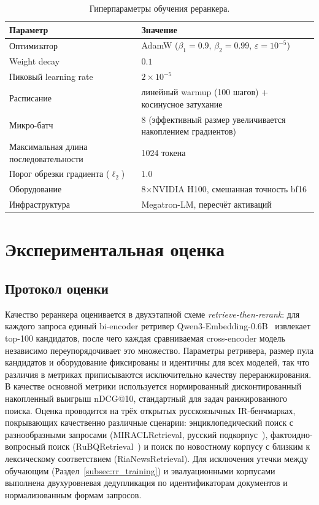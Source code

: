 \begin{table}[H]
    \centering
    \caption{Гиперпараметры обучения реранкера.}
    \label{tab:rr_hyperparams}
    \begin{tabular}{p{}p{}}
        \toprule
        Параметр & Значение \\
        \midrule
        Оптимизатор & AdamW ($\beta_1 = 0.9$, $\beta_2 = 0.99$, $\varepsilon = 10^{-5}$) \\
        Weight decay & $0.1$ \\
        Пиковый learning rate & $2 \times 10^{-5}$ \\
        Расписание & линейный warmup (100 шагов) + косинусное затухание \\
        Микро-батч & 8 (эффективный размер увеличивается накоплением градиентов) \\
        Максимальная длина последовательности & 1024 токена \\
        Порог обрезки градиента ($\ell_2$) & $1.0$ \\
        Оборудование & 8$\times$NVIDIA H100, смешанная точность bf16 \\
        Инфраструктура & Megatron-LM, пересчёт активаций \\
        \bottomrule
    \end{tabular}
\end{table}

\section{Экспериментальная оценка}\label{sec:rr_evaluation}

\subsection{Протокол оценки}\label{subsec:rr_protocol}

Качество реранкера оценивается в двухэтапной схеме \textit{retrieve-then-rerank}: для каждого запроса единый bi-encoder ретривер Qwen3-Embedding-0.6B~\cite{2506.05176} извлекает top-100 кандидатов, после чего каждая сравниваемая cross-encoder модель независимо переупорядочивает это множество.
Параметры ретривера, размер пула кандидатов и оборудование фиксированы и идентичны для всех моделей, так что различия в метриках приписываются исключительно качеству переранжирования.
В качестве основной метрики используется нормированный дисконтированный накопленный выигрыш nDCG@10, стандартный для задач ранжированного поиска.
Оценка проводится на трёх открытых русскоязычных IR-бенчмарках, покрывающих качественно различные сценарии: энциклопедический поиск с разнообразными запросами (MIRACLRetrieval, русский подкорпус~\cite{zhang2023miracl}), фактоидно-вопросный поиск (RuBQRetrieval~\cite{korablinov2020rubq}) и поиск по новостному корпусу с близким к лексическому соответствием (RiaNewsRetrieval).
Для исключения утечки между обучающим (Раздел~\ref{subsec:rr_training}) и эвалуационными корпусами выполнена двухуровневая дедупликация по идентификаторам документов и нормализованным формам запросов.

